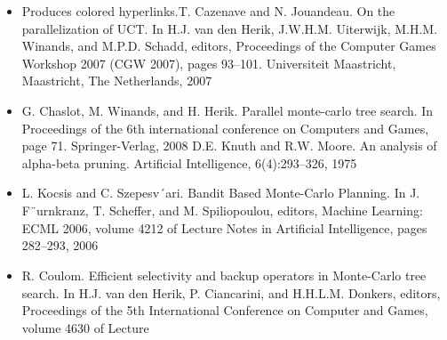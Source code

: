 \documentclass[sigconf]{acmart}
\begin{document}
\begin{itemize}
\item{\verb||}Produces colored hyperlinks.T. Cazenave and N. Jouandeau. On the parallelization of UCT. In H.J. van den Herik, J.W.H.M. Uiterwijk, M.H.M. Winands, and M.P.D. Schadd, editors, Proceedings of the Computer Games Workshop 2007 (CGW 2007), pages 93–101. Universiteit Maastricht, Maastricht, The Netherlands, 2007
\item{\verb||}G. Chaslot, M. Winands, and H. Herik. Parallel monte-carlo tree search. In Proceedings of the 6th international conference on Computers and Games, page 71. Springer-Verlag, 2008
D.E. Knuth and R.W. Moore. An analysis of alpha-beta pruning. Artificial Intelligence, 6(4):293–326, 1975
\item{\verb||}L. Kocsis and C. Szepesv´ari. Bandit Based Monte-Carlo Planning. In J. F¨urnkranz, T. Scheffer, and M. Spiliopoulou, editors, Machine Learning: ECML 2006, volume 4212 of Lecture Notes in Artificial Intelligence, pages 282–293, 2006
\item{\verb||}R. Coulom. Efficient selectivity and backup operators in Monte-Carlo tree search. In H.J. van den Herik, P. Ciancarini, and H.H.L.M. Donkers, editors, Proceedings of the 5th International Conference on Computer and Games, volume 4630 of Lecture 
\end{itemize}



% 

\end{document}
